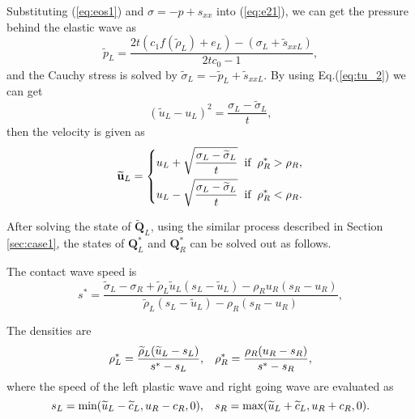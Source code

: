 \documentclass[review]{elsarticle}
\begin{document}
Substituting (\ref{eq:eos1}) and $\sigma=-p +s_{xx}$ into (\ref{eq:e21}), we can get the pressure behind the elastic wave as
\begin{equation}
  \widetilde{p}_L= \frac{2t(c_1f(\widetilde{\rho}_L)+e_L)-(\sigma_L+\widetilde{s}_{xxL})}{2tc_0-1},
\end{equation}
and the Cauchy stress is solved by $\widetilde{\sigma}_L = -\widetilde{p}_L+\widetilde{s}_{xxL}$. By using Eq.(\ref{eq:tu_2}) we can get
\begin{equation}
  (\widetilde{u}_L-u_L)^2 = \frac{\sigma_L-\widetilde{\sigma}_L}{t},
\end{equation}
then the velocity is given as
\begin{equation}
  \widetilde{\mathbf{u}}_L= \left\{
  \begin{aligned}
    u_L+\sqrt{\frac{\sigma_L-\widetilde{\sigma}_L}{t}} \hspace{0.2cm} \text{if} \hspace{0.2cm} \rho_R^* >\rho_R,\\
    u_L-\sqrt{\frac{\sigma_L-\widetilde{\sigma}_L}{t}} \hspace{0.2cm} \text{if} \hspace{0.2cm} \rho_R^* <\rho_R.\\
\end{aligned} \right.
\end{equation}

After solving  the state of $\widetilde{\mathbf{Q}}_L$,  using the similar process described in Section \ref{sec:case1}, the states of $\mathbf{Q}_L^*$ and $\mathbf{Q}_R^*$ can be solved  out as follows.

The contact wave speed is
\begin{equation}
  s^* = \frac{\widetilde{\sigma}_L-\sigma_R+\widetilde{\rho}_L \widetilde{u}_L(s_L-\widetilde{u}_L)-\rho_R u_R(s_R-u_R)}{\widetilde{\rho}_L(s_L-\widetilde{u}_L)-\rho_R(s_R-u_R)},
\end{equation}

The densities are
\begin{equation}
  \rho_L^* = \frac{\widetilde{\rho}_L(\widetilde{u}_L-s_L)}{s^*-s_L}, \hspace{0.3cm}  \rho_R^* = \frac{\rho_R(u_R-s_R)}{s^*-s_R},
\end{equation}
where  the speed of the  left  plastic wave and right going wave are evaluated as
\begin{equation}\label{eq:sp2}
      s_L = \text{min} (\widetilde{u}_L-\widetilde{c}_L, u_R-c_R, 0), \hspace{0.3cm} s_R = \text{max}(\widetilde{u}_L+\widetilde{c}_L, u_R+c_R, 0).
    \end{equation}
	
\end{document}
